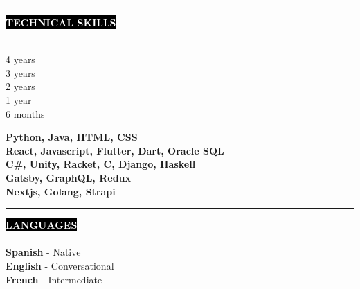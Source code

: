 \documentclass[11pt,A4]{article}
\newcounter{a}
\newcounter{b}
\newcounter{c}
\newcommand{\cvsection}[1] {
	\textcolor{white}{\MakeUppercase{\textbf{#1}}}
}
\newcommand{\cvsect}[1]{
	\colorbox{black}{{\cvsection{#1}}}\\\\%
}
\begin{document}
	\begin{minipage}[t]{0.65\textwidth}\hrule height 0pt width 0pt%
	\cvsect{Technical Skills}
	\begin{minipage}[t]{0.2\textwidth}%
		4 years\\ 3 years \\ 2 years \\ 1 year \\ 6 months
	\end{minipage}%
	\begin{minipage}[t]{0.7\textwidth}%
		\textbf{Python, Java, HTML, CSS} \\ \textbf{React, Javascript, Flutter, Dart, Oracle SQL} \\ \textbf{C\#, Unity, Racket, C, Django, Haskell} \\ \textbf{Gatsby, GraphQL, Redux} \\ \textbf{Nextjs, Golang, Strapi}
	\end{minipage}%
	\end{minipage}%
	\hspace{1cm}
	\begin{minipage}[t]{0.35\textwidth}\hrule height 0pt width 0pt%
		\cvsect{Languages}
		\textbf{Spanish} - Native\\
		\textbf{English} - Conversational\\
		\textbf{French} - Intermediate\\
	\end{minipage}%
\end{document}
